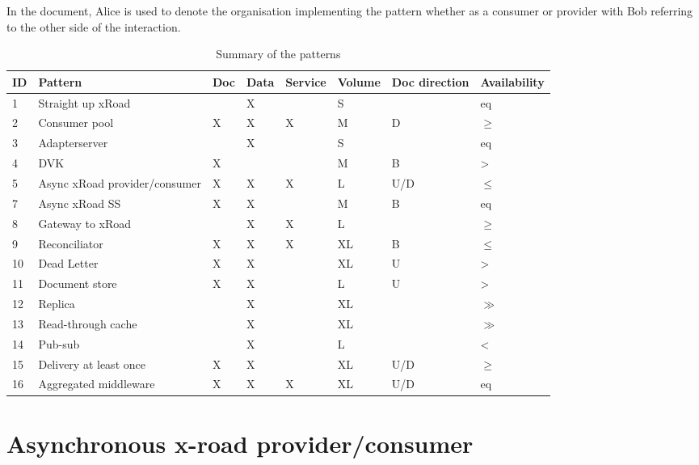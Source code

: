 \documentclass[10pt,a4paper]{article}
\begin{document}
In the document, Alice is used to denote the organisation implementing the pattern whether as a consumer or provider with Bob referring to the other side of the interaction.

\begin{table}
	\begin{center}
		\begin{tabular}{p{.6cm}p{3.4cm}p{.8cm}p{.8cm}p{.8cm}p{.8cm}p{1.2cm}p{1.2cm}}
		\toprule
ID & Pattern & Doc & Data & Service & Volume & Doc direction & Availability \\
\midrule
1 & Straight up xRoad &  & X &  & S &   & eq \\
2 & Consumer pool & X & X & X & M & D & $\geq$ \\
3 & Adapterserver &  & X &  & S &   & eq \\
4 & DVK & X &  &  & M & B & > \\
5 & Async xRoad provider/consumer & X & X & X & L & U/D & $\leq$ \\
7 & Async xRoad SS & X & X &  & M & B & eq \\
8 & Gateway to xRoad &  & X & X & L &   & $\geq$ \\
9 & Reconciliator & X & X & X & XL & B & $\leq$ \\
10 & Dead Letter & X & X &  & XL & U & > \\
11 & Document store & X & X &  & L & U & > \\
12 & Replica &  & X &  & XL &   & $\gg$ \\
13 & Read-through cache &  & X &  & XL &   & $\gg$ \\
14 & Pub-sub &  & X &  & L &  & < \\
15 & Delivery at least once & X & X & & XL & U/D & $\geq$ \\
16 & Aggregated middleware & X & X & X & XL & U/D & eq \\
\bottomrule
		\end{tabular}
		\caption{Summary of the patterns}
		\label{tab:dir}
	\end{center}
\end{table}

\section{Asynchronous x-road provider/consumer}
\label{sec:p:5}
\end{document}
